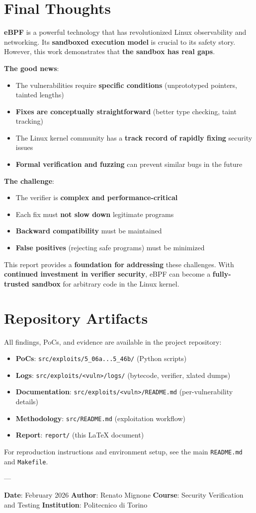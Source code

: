 \section{Final Thoughts}

\textbf{eBPF} is a powerful technology that has revolutionized Linux observability and networking. Its \textbf{sandboxed execution model} is crucial to its safety story. However, this work demonstrates that \textbf{the sandbox has real gaps}.

\textbf{The good news}:
\begin{itemize}
  \item The vulnerabilities require \textbf{specific conditions} (unprototyped pointers, tainted lengths)
  \item \textbf{Fixes are conceptually straightforward} (better type checking, taint tracking)
  \item The Linux kernel community has a \textbf{track record of rapidly fixing} security issues
  \item \textbf{Formal verification and fuzzing} can prevent similar bugs in the future
\end{itemize}

\textbf{The challenge}:
\begin{itemize}
  \item The verifier is \textbf{complex and performance-critical}
  \item Each fix must \textbf{not slow down} legitimate programs
  \item \textbf{Backward compatibility} must be maintained
  \item \textbf{False positives} (rejecting safe programs) must be minimized
\end{itemize}

This report provides a \textbf{foundation for addressing} these challenges. With \textbf{continued investment in verifier security}, eBPF can become a \textbf{fully-trusted sandbox} for arbitrary code in the Linux kernel.

\section{Repository Artifacts}

All findings, PoCs, and evidence are available in the project repository:

\begin{itemize}
  \item \textbf{PoCs}: \texttt{src/exploits/5\_06a...5\_46b/} (Python scripts)
  \item \textbf{Logs}: \texttt{src/exploits/<vuln>/logs/} (bytecode, verifier, xlated dumps)
  \item \textbf{Documentation}: \texttt{src/exploits/<vuln>/README.md} (per-vulnerability details)
  \item \textbf{Methodology}: \texttt{src/README.md} (exploitation workflow)
  \item \textbf{Report}: \texttt{report/} (this LaTeX document)
\end{itemize}

For reproduction instructions and environment setup, see the main \texttt{README.md} and \texttt{Makefile}.

---

\textbf{Date}: February 2026  
\textbf{Author}: Renato Mignone  
\textbf{Course}: Security Verification and Testing  
\textbf{Institution}: Politecnico di Torino
